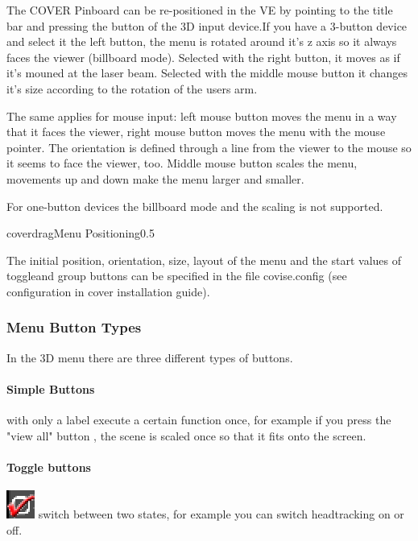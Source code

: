 The COVER Pinboard can be re-positioned in the VE by pointing to the title bar
and pressing the button of the 3D input device.If you have a 3-button device
and select it the left button, the menu is rotated around it's z axis so it 
always faces the viewer (billboard mode). Selected with the right button, it moves as if it's
mouned at the laser beam. Selected with the middle mouse button
it changes it's size according to the rotation of the users arm. 

The same applies for mouse input: left mouse button moves the menu in a 
way that it faces the viewer, right mouse button moves the menu with the
mouse pointer. The orientation is defined through a line from the viewer
to the mouse so it seems to face the viewer, too. Middle mouse button
scales the menu, movements up and down make the menu larger and smaller. 

For one-button devices the billboard mode and the scaling is not supported.


\begin{covimg}{cover}{drag}{Menu Positioning}{0.5}\end{covimg}

The initial position, orientation, size, layout of the menu and the start 
values of toggleand group buttons can be specified in the file covise.config
(see configuration in cover installation guide).

\subsubsection{Menu Button Types}

In the 3D menu there are three different types of buttons.

\paragraph{Simple Buttons} with only a label execute a certain function once, for example
if you press the "view all"  button , the scene is scaled once so that 
it fits onto the screen.

\paragraph{Toggle buttons} 
\latexonly
\includegraphics[scale=0.5]{cover/pict/toggle_button_icon} 
\endlatexonly
{}
switch between two states, for example you can
switch headtracking on or off.



